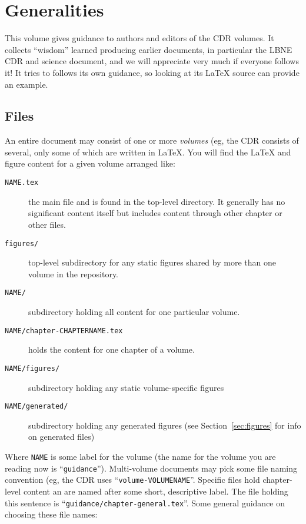 \chapter{Generalities}
\label{ch:generalities}

This volume gives guidance to authors and editors of the CDR volumes. It collects ``wisdom'' learned 
producing earlier documents, in particular the LBNE CDR and science document, and we will appreciate 
very much if everyone follows it!  It tries to follows its own guidance, so looking at its \LaTeX{} source can 
provide an example.  
\section{Files}
\label{sec:files}

An entire document may consist of one or more \textit{volumes} (eg,
the CDR consists of several, only some of which are written in
\LaTeX{}.
You will find the \LaTeX{} and figure content for a given volume
arranged like:

\begin{description}
\item[\texttt{NAME.tex}] the main file and is found in the top-level
  directory. It generally has no significant content itself but
  includes content through other chapter or other files.
\item[\texttt{figures/}] top-level subdirectory for any static figures
  shared by more than one volume in the repository.
\item[\texttt{NAME/}] subdirectory holding all content for one particular volume.
\item[\texttt{NAME/chapter-CHAPTERNAME.tex}] holds the content for one
  chapter of a volume.
\item[\texttt{NAME/figures/}] subdirectory holding any static volume-specific figures
\item[\texttt{NAME/generated/}] subdirectory holding any generated
  figures (see Section~\ref{sec:figures} for info on generated files)
\end{description}

Where \texttt{NAME} is some label for the volume (the name for the
volume you are reading now is ``\texttt{guidance}'').
Multi-volume documents may pick some file naming convention (eg, the
CDR uses ``\texttt{volume-VOLUMENAME}''.
Specific files hold chapter-level content an are named after some
short, descriptive label.
The file holding this sentence is ``\texttt{guidance/chapter-general.tex}''.
Some general guidance on choosing these file names:

